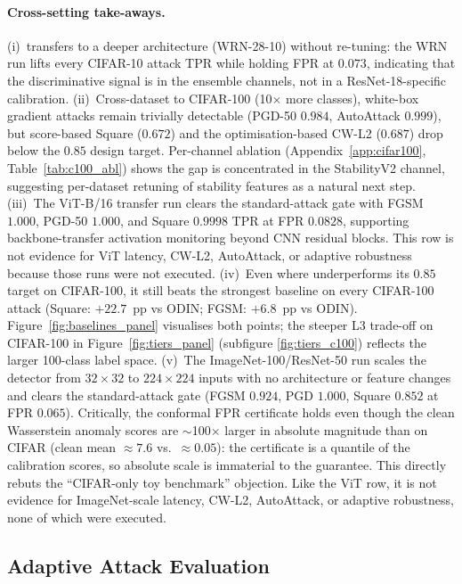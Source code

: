 \paragraph{Cross-setting take-aways.}
(i)~\prism transfers to a deeper architecture (WRN-28-10) without
re-tuning: the WRN run lifts every CIFAR-10 attack TPR while holding
FPR at $0.073$, indicating that the discriminative signal is in the
ensemble channels, not in a ResNet-18-specific calibration.
(ii)~Cross-dataset to CIFAR-100 (10$\times$ more classes), white-box
gradient attacks remain trivially detectable (PGD-50 $0.984$,
AutoAttack $0.999$), but score-based Square ($0.672$) and the
optimisation-based CW-L2 ($0.687$) drop below the $0.85$ design target.
Per-channel ablation (Appendix~\ref{app:cifar100}, Table~\ref{tab:c100_abl})
shows the gap is concentrated in the StabilityV2 channel, suggesting
per-dataset retuning of stability features as a natural next step.
(iii)~The ViT-B/16 transfer run clears the standard-attack gate with
FGSM $1.000$, PGD-50 $1.000$, and Square $0.9998$ TPR at FPR $0.0828$,
supporting backbone-transfer activation monitoring beyond CNN
residual blocks. This row is not evidence for ViT latency, CW-L2,
AutoAttack, or adaptive robustness because those runs were not executed.
(iv)~Even where \prism underperforms its $0.85$ target on CIFAR-100,
it still beats the strongest baseline on every CIFAR-100 attack
(Square: $+22.7$~pp vs ODIN; FGSM: $+6.8$~pp vs ODIN).
Figure~\ref{fig:baselines_panel} visualises both points; the steeper
L3 trade-off on CIFAR-100 in Figure~\ref{fig:tiers_panel} (subfigure
\ref{fig:tiers_c100}) reflects the larger 100-class label space.
(v)~The ImageNet-100/ResNet-50 run scales the detector from
$32\times32$ to $224\times224$ inputs with no architecture or feature
changes and clears the standard-attack gate (FGSM $0.924$, PGD $1.000$,
Square $0.852$ at FPR $0.065$). Critically, the conformal FPR
certificate holds even though the clean Wasserstein anomaly scores are
$\sim$100$\times$ larger in absolute magnitude than on CIFAR (clean mean
$\approx 7.6$ vs.\ $\approx 0.05$): the certificate is a quantile of the
calibration scores, so absolute scale is immaterial to the guarantee.
This directly rebuts the ``CIFAR-only toy benchmark'' objection. Like the
ViT row, it is not evidence for ImageNet-scale latency, CW-L2,
AutoAttack, or adaptive robustness, none of which were executed.

\subsection{Adaptive Attack Evaluation}
\label{sec:adaptive}


